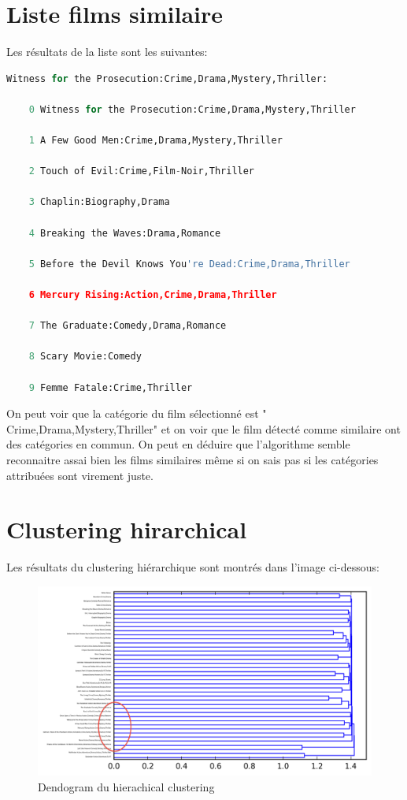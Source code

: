 	

	
	\section{Liste films similaire}
	Les résultats de la liste sont les suivantes:
		\begin{lstlisting}[language=python]
Witness for the Prosecution:Crime,Drama,Mystery,Thriller:

	0 Witness for the Prosecution:Crime,Drama,Mystery,Thriller

	1 A Few Good Men:Crime,Drama,Mystery,Thriller

	2 Touch of Evil:Crime,Film-Noir,Thriller

	3 Chaplin:Biography,Drama

	4 Breaking the Waves:Drama,Romance

	5 Before the Devil Knows You're Dead:Crime,Drama,Thriller

	6 Mercury Rising:Action,Crime,Drama,Thriller

	7 The Graduate:Comedy,Drama,Romance

	8 Scary Movie:Comedy

	9 Femme Fatale:Crime,Thriller
		\end{lstlisting}
		
		On peut voir que la catégorie du film sélectionné est "	Crime,Drama,Mystery,Thriller" et on voir que le film détecté comme similaire ont des catégories en commun. On peut en déduire que l'algorithme semble reconnaitre assai bien les films similaires même si on sais pas si les catégories attribuées sont virement juste. 
	
	
	\section{Clustering hirarchical}
	Les résultats du clustering hiérarchique sont montrés dans l'image ci-dessous:
	\begin{figure}[h]
	  \centering
	    \includegraphics[width=0.6\linewidth]{img/clustering50_tf_idf.png}
	  \caption{Dendogram du hierachical clustering}
	  \label{hierarchical}
	\end{figure}
	
